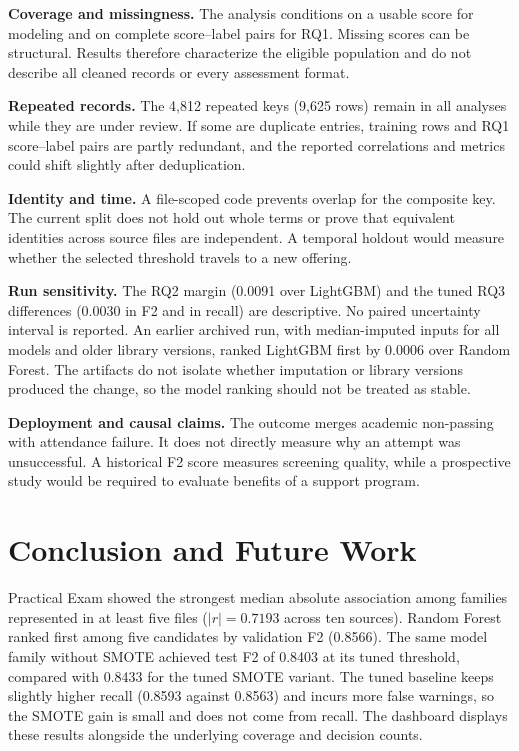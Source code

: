 \documentclass[runningheads]{llncs}
\begin{document}
\textbf{Coverage and missingness.} The analysis conditions on a usable score for modeling and on complete score--label pairs for RQ1. Missing scores can be structural. Results therefore characterize the eligible population and do not describe all cleaned records or every assessment format.

\textbf{Repeated records.} The 4,812 repeated keys (9,625 rows) remain in all analyses while they are under review. If some are duplicate entries, training rows and RQ1 score--label pairs are partly redundant, and the reported correlations and metrics could shift slightly after deduplication.

\textbf{Identity and time.} A file-scoped code prevents overlap for the composite key. The current split does not hold out whole terms or prove that equivalent identities across source files are independent. A temporal holdout would measure whether the selected threshold travels to a new offering.

\textbf{Run sensitivity.} The RQ2 margin (0.0091 over LightGBM) and the tuned RQ3 differences (0.0030 in F2 and in recall) are descriptive. No paired uncertainty interval is reported. An earlier archived run, with median-imputed inputs for all models and older library versions, ranked LightGBM first by 0.0006 over Random Forest. The artifacts do not isolate whether imputation or library versions produced the change, so the model ranking should not be treated as stable.

\textbf{Deployment and causal claims.} The outcome merges academic non-passing with attendance failure. It does not directly measure why an attempt was unsuccessful. A historical F2 score measures screening quality, while a prospective study would be required to evaluate benefits of a support program.

\section{Conclusion and Future Work}
Practical Exam showed the strongest median absolute association among families represented in at least five files ($|r|=0.7193$ across ten sources). Random Forest ranked first among five candidates by validation F2 (0.8566). The same model family without SMOTE achieved test F2 of 0.8403 at its tuned threshold, compared with 0.8433 for the tuned SMOTE variant. The tuned baseline keeps slightly higher recall (0.8593 against 0.8563) and incurs more false warnings, so the SMOTE gain is small and does not come from recall. The dashboard displays these results alongside the underlying coverage and decision counts.
\end{document}
